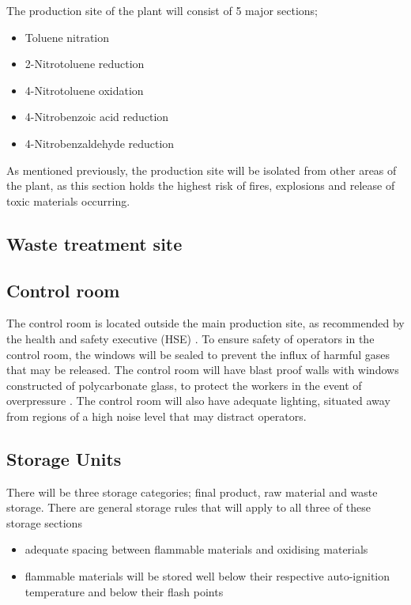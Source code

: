 The production site of the plant will consist of 5 major sections; 

\begin{itemize}
    \item Toluene nitration
    \item 2-Nitrotoluene reduction 
    \item 4-Nitrotoluene oxidation 
    \item 4-Nitrobenzoic acid reduction 
    \item 4-Nitrobenzaldehyde reduction 
\end{itemize}

As mentioned previously, the production site will be isolated from other areas of the plant, as this section holds the highest risk of fires, explosions  and release of toxic materials occurring. 

\subsection{Waste treatment site}





\subsection{Control room}

The control room is located outside the main production site, as recommended by the health and safety executive (HSE) \cite{health_and_safety_executive_control_nodate}. To ensure safety of operators in the control room, the windows will be sealed to prevent the influx of harmful gases that may be released. The control room will have blast proof walls with windows constructed of polycarbonate glass, to protect the workers in the event of overpressure \cite{health_and_safety_executive_control_nodate}. The control room will also have adequate lighting, situated away from regions of a high noise level that may distract operators. 

\subsection{Storage Units}

There will be three storage categories; final product, raw material and waste storage. There are general storage rules that will apply to all three of these storage sections 

\begin{itemize}
    \item adequate spacing between flammable materials and oxidising materials 
    \item flammable materials will be stored well below their respective auto-ignition temperature and below their flash points
\end{itemize}

